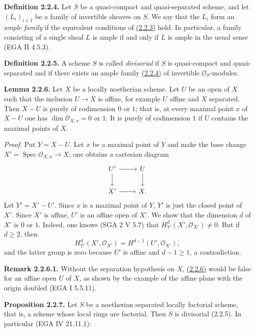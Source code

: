 \textbf{Definition 2.2.4.} Let $S$ be a quasi-compact and quasi-separated scheme, and let $(L_i)_{i\in I}$ be a family of invertible sheaves on $S$. We say that the $L_i$ form an \emph{ample family} if the equivalent conditions of \hyperlink{sga6.e02.prop.2-2-3}{(2.2.3)} hold. In particular, a family consisting of a single sheaf $L$ is ample if and only if $L$ is ample in the usual sense (EGA II 4.5.3).

\textbf{Definition 2.2.5.} A scheme $S$ is called \emph{divisorial} if $S$ is quasi-compact and quasi-separated and if there exists an ample family \hyperlink{sga6.e02.def.2-2-4}{(2.2.4)} of invertible $\mathcal O_S$-modules.

\textbf{Lemma 2.2.6.} Let $X$ be a locally noetherian scheme. Let $U$ be an open of $X$ such that the inclusion $U\to X$ is affine, for example $U$ affine and $X$ separated. Then $X-U$ is purely of codimension $0$ or $1$; that is, at every maximal point $x$ of $X-U$ one has $\dim\mathcal O_{X,x}=0$ or $1$. It is purely of codimension $1$ if $U$ contains the maximal points of $X$.

\emph{Proof.} Put $Y=X-U$. Let $x$ be a maximal point of $Y$ and make the base change $X'=\operatorname{Spec}\mathcal O_{X,x}\to X$; one obtains a cartesian diagram
\[
\begin{tikzcd}
U' \arrow[r] \arrow[d] & U \arrow[d] \\
X' \arrow[r] & X .
\end{tikzcd}
\]
Let $Y'=X'-U'$. Since $x$ is a maximal point of $Y$, $Y'$ is just the closed point of $X'$. Since $X'$ is affine, $U'$ is an affine open of $X'$. We show that the dimension $d$ of $X'$ is $0$ or $1$. Indeed, one knows (SGA 2 V 5.7) that $H^d_{Y'}(X',\mathcal O_{X'})\ne0$. But if $d\ge2$, then
\[
H^d_{Y'}(X',\mathcal O_{X'})=H^{d-1}(U',\mathcal O_{X'}),
\]
and the latter group is zero because $U'$ is affine and $d-1\ge1$, a contradiction.

\textbf{Remark 2.2.6.1.} Without the separation hypothesis on $X$, \hyperlink{sga6.e02.lem.2-2-6}{(2.2.6)} would be false for an affine open $U$ of $X$, as shown by the example of the affine plane with the origin doubled (EGA I 5.5.11).

\textbf{Proposition 2.2.7.} Let $S$ be a noetherian separated locally factorial scheme, that is, a scheme whose local rings are factorial. Then $S$ is divisorial (2.2.5). In particular (EGA IV 21.11.1):

